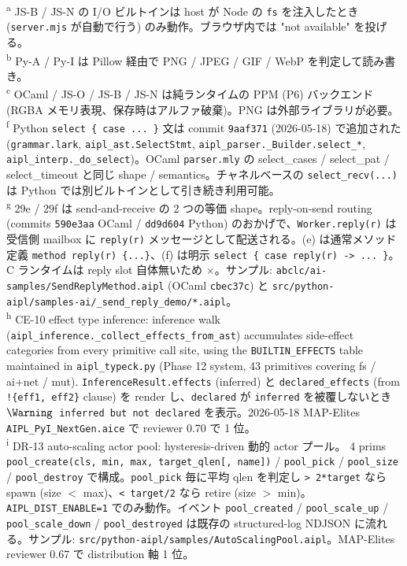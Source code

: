 \documentclass[10pt,a4paper,landscape]{article}
\newcommand{\No}{\textcolor{red!70!black}{$\times$}}
\begin{document}
\textsuperscript{a} \small JS-B / JS-N の I/O ビルトインは host が Node の \texttt{fs} を注入したとき (\texttt{server.mjs} が自動で行う) のみ動作。ブラウザ内では "not available" を投げる。\\
\textsuperscript{b} \small Py-A / Py-I は Pillow 経由で PNG / JPEG / GIF / WebP を判定して読み書き。\\
\textsuperscript{c} \small OCaml / JS-O / JS-B / JS-N は純ランタイムの PPM (P6) バックエンド (RGBA メモリ表現、保存時はアルファ破棄)。PNG は外部ライブラリが必要。\\
\textsuperscript{f} \small Python \texttt{select \{ case ... \}} 文は commit \texttt{9aaf371} (2026-05-18) で追加された (\texttt{grammar.lark}, \texttt{aipl\_ast.SelectStmt}, \texttt{aipl\_parser.\_Builder.select\_*}, \texttt{aipl\_interp.\_do\_select})。OCaml \texttt{parser.mly} の select\_cases / select\_pat / select\_timeout と同じ shape / semantics。チャネルベースの \texttt{select\_recv(...)} は Python では別ビルトインとして引き続き利用可能。\\
\textsuperscript{g} \small 29e / 29f は send-and-receive の 2 つの等価 shape。reply-on-send routing (commits \texttt{590e3aa} OCaml / \texttt{dd9d604} Python) のおかげで、\texttt{Worker.reply(r)} は受信側 mailbox に \texttt{reply(r)} メッセージとして配送される。(e) は通常メソッド定義 \texttt{method reply(r) \{...\}}、(f) は明示 \texttt{select \{ case reply(r) -> ... \}}。C ランタイムは reply slot 自体無いため \No。サンプル: \texttt{abclc/ai-samples/SendReplyMethod.aipl} (OCaml \texttt{cbec37c}) と \texttt{src/python-aipl/samples-ai/\_send\_reply\_demo/*.aipl}。\\
\textsuperscript{h} \small CE-10 effect type inference: inference walk (\texttt{aipl\_inference.\_collect\_effects\_from\_ast}) accumulates side-effect categories from every primitive call site, using the \texttt{BUILTIN\_EFFECTS} table maintained in \texttt{aipl\_typeck.py} (Phase 12 system, 43 primitives covering fs / ai+net / mut). \texttt{InferenceResult.effects} (inferred) と \texttt{declared\_effects} (from \texttt{!\{eff1, eff2\}} clause) を render し、\texttt{declared} が \texttt{inferred} を被覆しないとき \texttt{$\Warning$ inferred but not declared} を表示。2026-05-18 MAP-Elites \texttt{AIPL\_PyI\_NextGen.aice} で reviewer 0.70 で 1 位。\\
\textsuperscript{i} \small DR-13 auto-scaling actor pool: hysteresis-driven 動的 actor プール。 4 prims \texttt{pool\_create(cls, min, max, target\_qlen[, name])} / \texttt{pool\_pick} / \texttt{pool\_size} / \texttt{pool\_destroy} で構成。\texttt{pool\_pick} 毎に平均 qlen を判定し \texttt{> 2*target} なら spawn (size $<$ max)、\texttt{< target/2} なら retire (size $>$ min)。\texttt{AIPL\_DIST\_ENABLE=1} でのみ動作。イベント \texttt{pool\_created} / \texttt{pool\_scale\_up} / \texttt{pool\_scale\_down} / \texttt{pool\_destroyed} は既存の structured-log NDJSON に流れる。サンプル: \texttt{src/python-aipl/samples/AutoScalingPool.aipl}。MAP-Elites reviewer 0.67 で distribution 軸 1 位。\\
\end{document}

